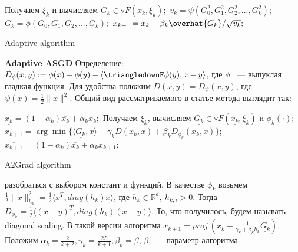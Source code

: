 \documentclass[oneside,final,12pt]{article}
\begin{document}
\begin{algorithm}[H]
\SetAlgoLined
{}
 {
    Получаем $\xi_k$ и вычисляем $G_k \in \triangledown F(x_k, \xi_k)$;\
    $v_k = \psi(G_0^2, G_1^2, G_2^2, ...,G_k^2)$;\newline
    $G_k = \phi(G_0, G_1, G_2, ..., G_k);$\newline
    $x_{k+1} = x_k - \beta_k\overhat{G_k}/\sqrt{v_k};$
}
 \caption{Adaptive algorithm}
\end{algorithm}
\newline
\break\noindent\textbf{\Large{Adaptive ASGD}}\newline\break
Определение: $D_\phi(x, y) := \phi(x) - \phi(y) - \langle \triangledownF \phi(y), x - y\rangle$, где $\phi$ ~--- выпуклая гладкая функция.\newline
Для удобства положим $D(x, y) = D_\psi(x, y)$, где $\psi(x) = \frac{1}{2}\|x\|^2.$\newline\newline
Общий вид рассматриваемого в статье метода выглядит так:\newline
\begin{algorithm}[H]
\SetAlgoLined
{}
 {
    $\underline{x_k} = (1 - \alpha_k)\overline{x_k} + \alpha_k x_k;$\newline
    Получаем $\xi_k$, вычисляем $\underline{G_k}\in\triangledown F(\underline{x_k}, \xi_k)$ и $\phi_k(\cdot)$;\newline
    $x_{k+1} = \arg \min \{\langle \underline{G_k}, x\rangle + \gamma_k D(x_k, x) + \beta_k D_{\phi_k}(x_k, x)\}$;\newline
    $\overline{x_{k+1}} = (1 - \alpha_k)\overline{x_k} + \alpha_k x_{k+1}$;
}
 \caption{A2Grad algorithm}
\end{algorithm}\newline
{} разобраться с выбором констант и функций.\newline
В качестве $\phi_k$ возьмём $\frac{1}{2}\|x\|^2_{h_k} = \frac{1}{2}\langle x^T, diag(h_k)x\rangle$, где $h_k \in \mathbb{R}^d,\ h_{k, i} > 0$. Тогда $D_{\phi_k} = \frac{1}{2}\langle (x - y)^T, diag(h_k)(x - y)\rangle$. То, что получилось, будем называть diagonal scaling. В такой версии алгоритма $x_{k+1} = proj\ (x_k - \frac{1}{\gamma_k + \beta_k h_k}\underline{G_k})$.\newline
Положим $\alpha_k = \frac{2}{k + 2}, \gamma_k = \frac{2L}{k + 1}, \beta_k = \beta$, $\beta$ ~--- параметр алгоритма.\newline
\end{document}
